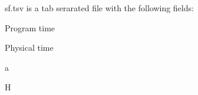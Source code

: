 sf.tsv is a tab serarated file with the following fields:

\begin{DoxyItemize}
\item Program time \item Physical time \item a \item H \end{DoxyItemize}

